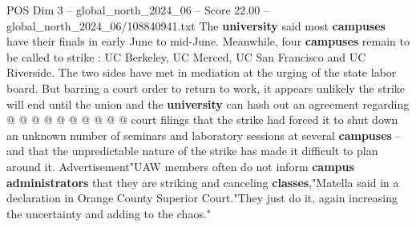 \begin{textsample}{POS Dim 3 – global\_north\_2024\_06 – Score 22.00 – global\_north\_2024\_06/108840941.txt}
The \textbf{university} said most \textbf{campuses} have their finals in early June to mid-June.
Meanwhile, four \textbf{campuses} remain to be called to strike : UC Berkeley, UC Merced, UC San Francisco and UC Riverside.
The two sides have met in mediation at the urging of the state labor board.
But barring a court order to return to work, it appears unlikely the strike will end until the union and the \textbf{university} can hash out an agreement regarding @ @ @ @ @ @ @ @ @ @ court filings that the strike had forced it to shut down an unknown number of seminars and laboratory sessions at several \textbf{campuses} -- and that the unpredictable nature of the strike has made it difficult to plan around it.
Advertisement"UAW members often do not inform \textbf{campus} \textbf{administrators} that they are striking and canceling \textbf{classes},"Matella said in a declaration in Orange County Superior Court."They just do it, again increasing the uncertainty and adding to the chaos."

\end{textsample}
